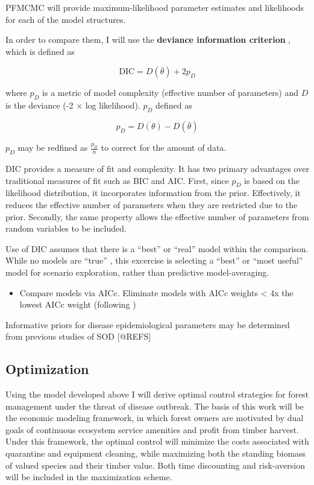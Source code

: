 \documentclass[english,nohyper,nofonts,nobib,nols,twoside]{tufte-handout}
\renewcommand\citep\cite
\let\oldcitet\citet
\renewcommand{\citet}[1]{\oldcitet{#1}\cite{#1}}
\begin{document}
PFMCMC will provide maximum-likelihood parameter estimates and
likelihoods for each of the model structures.

In order to compare them, I will use the \textbf{deviance information
criterion} \citep[DIC]{Spiegelhalter2002}, which is defined as

\[\text{DIC} = D(\bar\theta) + 2p_D\]

where $p_D$ is a metric of model complexity (effective number of
parameters) and $D$ is the deviance (-2 $\times$ log likelihood). $p_D$
defined as

\[p_D = \overline{D(\theta)} - D(\bar{\theta})\]

$p_D$ may be redfined as $\frac{p_D}{n}$ to correct for the amount of
data.

DIC provides a measure of fit and complexity. It has two primary
advantages over traditional measures of fit such as BIC and AIC. First,
since $p_D$ is based on the likelihood distribution, it incorporates
information from the prior. Effectively, it reduces the effective number
of parameters when they are restricted due to the prior. Secondly, the
same property allows the effective number of parameters from random
variables to be included.

Use of DIC assumes that there is a ``best'' or ``real'' model within the
comparison. While no models are ``true'' \citep{Box1976}, this excercise
is selecting a ``best'' or ``most useful'' model for scenario
exploration, rather than predictive model-averaging.

\begin{itemize}
\itemsep1pt\parskip0pt
\item
  Compare models via AICc. Eliminate models with AICc weights
  \textless{} 4x the lowest AICc weight (following \citet{Maunder2011})
\end{itemize}

Informative priors for disease epidemiological parameters may be
determined from previous studies of SOD {[}@REFS{]}

\subsection{Optimization}

Using the model developed above I will derive optimal control strategies
for forest management under the threat of disease outbreak. The basis of
this work will be the \citet{Hartman1976} economic modeling framework,
in which forest owners are motivated by dual goals of continuous
ecosystem service amenities and profit from timber harvest. Under this
framework, the optimal control will minimize the costs associated with
quarantine and equipment cleaning, while maximizing both the standing
biomass of valued species and their timber value. Both time discounting
and risk-aversion will be included in the maximization scheme.
\end{document}

